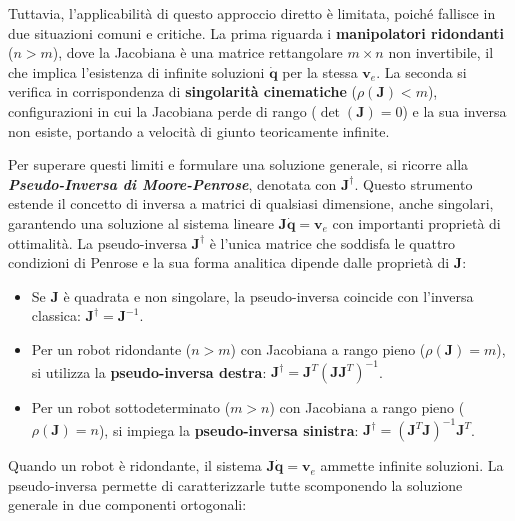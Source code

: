 \documentclass[11pt, a4paper]{report}
\begin{document}
Tuttavia, l'applicabilità di questo approccio diretto è  limitata, poiché fallisce in due situazioni comuni e critiche. La prima riguarda i \textbf{manipolatori ridondanti} (\(n > m\)), dove la Jacobiana è una matrice rettangolare \(m \times n\) non invertibile, il che implica l'esistenza di infinite soluzioni \(\dot{\bm{q}}\) per la stessa \(\bm{v}_e\). La seconda si verifica in corrispondenza di \textbf{singolarità cinematiche} (\(\rho(\bm{J}) < m\)), configurazioni in cui la Jacobiana perde di rango (\(\det(\bm{J}) = 0\)) e la sua inversa non esiste, portando a velocità di giunto teoricamente infinite.

Per superare questi limiti e formulare una soluzione generale, si ricorre alla \textbf{\textit{Pseudo-Inversa di Moore-Penrose}}, denotata con \(\bm{J}^{\dagger}\). Questo strumento estende il concetto di inversa a matrici di qualsiasi dimensione, anche singolari, garantendo una soluzione al sistema lineare \(\bm{J}\dot{\bm{q}} = \bm{v}_e\) con importanti proprietà di ottimalità. La pseudo-inversa \(\bm{J}^\dagger\) è l'unica matrice che soddisfa le quattro condizioni di Penrose e la sua forma analitica dipende dalle proprietà di \(\bm{J}\):
\begin{itemize}
    \item Se \(\bm{J}\) è quadrata e non singolare, la pseudo-inversa coincide con l'inversa classica: \(\bm{J}^\dagger = \bm{J}^{-1}\).
    \item Per un robot ridondante (\(n > m\)) con Jacobiana a rango pieno (\(\rho(\bm{J}) = m\)), si utilizza la \textbf{pseudo-inversa destra}: \( \bm{J}^\dagger = \bm{J}^T(\bm{J}\bm{J}^T)^{-1} \).
    \item Per un robot sottodeterminato (\(m > n\)) con Jacobiana a rango pieno (\(\rho(\bm{J}) = n\)), si impiega la \textbf{pseudo-inversa sinistra}: \( \bm{J}^\dagger = (\bm{J}^T\bm{J})^{-1}\bm{J}^T \).
\end{itemize}
Quando un robot è ridondante, il sistema \(\bm{J}\dot{\bm{q}} = \bm{v}_e\) ammette infinite soluzioni. La pseudo-inversa permette di caratterizzarle tutte scomponendo la soluzione generale in due componenti ortogonali:
\end{document}
